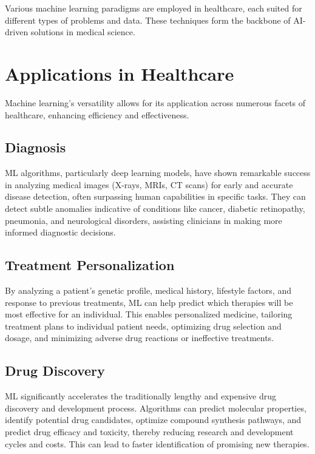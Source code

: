 \documentclass[11pt]{article}
\begin{document}
Various machine learning paradigms are employed in healthcare, each suited for different types of problems and data. These techniques form the backbone of AI-driven solutions in medical science.

\section{Applications in Healthcare}

Machine learning's versatility allows for its application across numerous facets of healthcare, enhancing efficiency and effectiveness.

\subsection{Diagnosis}

ML algorithms, particularly deep learning models, have shown remarkable success in analyzing medical images (X-rays, MRIs, CT scans) for early and accurate disease detection, often surpassing human capabilities in specific tasks. They can detect subtle anomalies indicative of conditions like cancer, diabetic retinopathy, pneumonia, and neurological disorders, assisting clinicians in making more informed diagnostic decisions.

\subsection{Treatment Personalization}

By analyzing a patient's genetic profile, medical history, lifestyle factors, and response to previous treatments, ML can help predict which therapies will be most effective for an individual. This enables personalized medicine, tailoring treatment plans to individual patient needs, optimizing drug selection and dosage, and minimizing adverse drug reactions or ineffective treatments.

\subsection{Drug Discovery}

ML significantly accelerates the traditionally lengthy and expensive drug discovery and development process. Algorithms can predict molecular properties, identify potential drug candidates, optimize compound synthesis pathways, and predict drug efficacy and toxicity, thereby reducing research and development cycles and costs. This can lead to faster identification of promising new therapies.
\end{document}
